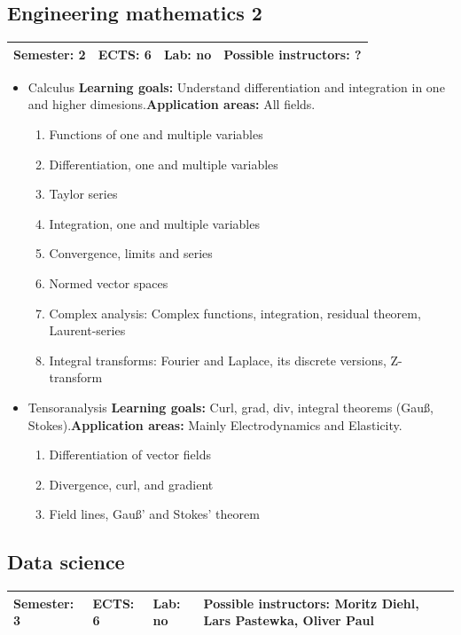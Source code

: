 \documentclass[12pt,twoside,fleqn,a4paper]{article}
\newcommand{\goalapps}[2]{\newline\textbf{Learning goals:} #1\newline\textbf{Application areas:} #2}
\begin{document}
\subsection{Engineering mathematics 2}
\begin{tabular}{llll} \hline
\textbf{Semester:} 2 & \textbf{ECTS:} 6 & \textbf{Lab:} no & \textbf{Possible instructors:} ?\\
\hline
\end{tabular}

\begin{itemize}
\setlength\itemsep{0cm}
\item Calculus
\goalapps{Understand differentiation and integration in one and higher dimesions.}{All fields.}

\begin{enumerate}
    \item Functions of one and multiple variables
    \item Differentiation, one and multiple variables
    \item Taylor series
    \item Integration, one and multiple variables
    \item Convergence, limits and series
    \item Normed vector spaces
    \item Complex analysis: Complex functions, integration, residual theorem, Laurent-series
    \item Integral transforms: Fourier and Laplace, its discrete versions, Z-transform
\end{enumerate}
\item Tensoranalysis
\goalapps{Curl, grad, div, integral theorems (Gauß, Stokes).}{Mainly Electrodynamics and Elasticity.}

\begin{enumerate}
    \item Differentiation of vector fields
    \item Divergence, curl, and gradient
    \item Field lines, Gauß' and Stokes' theorem
\end{enumerate}
\end{itemize}


\subsection{Data science}
\begin{tabular}{llll} \hline
\textbf{Semester:} 3 & \textbf{ECTS:} 6 & \textbf{Lab:} no & \textbf{Possible instructors:} Moritz Diehl, Lars Pastewka, Oliver Paul \\
\hline
\end{tabular}
\end{document}

